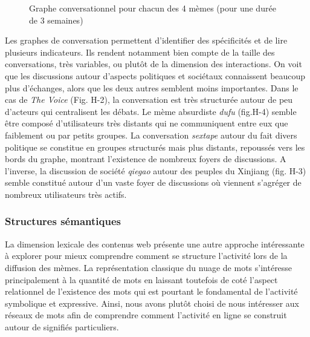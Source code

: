 \begin{figure}
{    }
    
  \caption{  
    Graphe conversationnel pour chacun des 4 m\`emes (pour une dur\'ee de 3 semaines)
  }
\end{figure}

Les graphes de conversation permettent d{\textquoteright}identifier des
sp\'ecificit\'es et de lire plusieurs indicateurs. Ils rendent
notamment bien compte de la taille des conversations, tr\`es variables,
ou plut\^ot de la dimension des interactions. On voit que les
discussions autour d{\textquoteright}aspects politiques et soci\'etaux
connaissent beaucoup plus d{\textquoteright}\'echanges, alors que les
deux autres semblent moins importantes. Dans le cas de \textit{The
Voice} (Fig. H-2), la conversation est tr\`es structur\'ee autour de
peu d{\textquoteright}acteurs qui centralisent les d\'ebats. Le m\`eme
absurdiste \textit{dufu }(fig.H-4) semble \^etre compos\'e
d{\textquoteright}utilisateurs tr\`es distants qui ne communiquent
entre eux que faiblement ou par petits groupes. La conversation
\textit{sextape }autour du fait divers politique se constitue en
groupes structur\'es mais plus distants, repouss\'es vers les bords du
graphe, montrant l{\textquoteright}existence de nombreux foyers de
discussions. A l{\textquoteright}inverse, la discussion de soci\'et\'e
\textit{qiegao}\textit{ }autour des peuples du Xinjiang (fig. H-3)
semble constitu\'e autour d{\textquoteright}un vaste foyer de
discussions o\`u viennent s{\textquoteright}agr\'eger de nombreux
utilisateurs tr\`es actifs.

\subsubsection[Structures s\'emantiques]{Structures s\'emantiques}
La dimension lexicale des contenus web pr\'esente une autre approche
int\'eressante \`a explorer pour mieux comprendre comment se structure
l{\textquoteright}activit\'e lors de la diffusion des m\`emes. La
repr\'esentation classique du nuage de mots
s{\textquoteright}int\'eresse principalement \`a la quantit\'e de mots
en laissant toutefois de cot\'e l{\textquoteright}aspect relationnel de
l{\textquoteright}existence des mots qui est pourtant le fondamental de
l{\textquoteright}activit\'e symbolique et expressive. Ainsi, nous
avons plut\^ot choisi de nous int\'eresser aux r\'eseaux de mots afin
de comprendre comment l{\textquoteright}activit\'e en ligne se
construit autour de signifi\'es particuliers.


